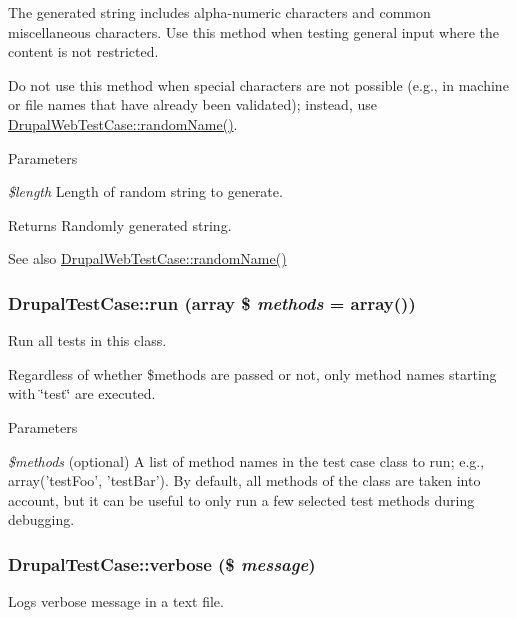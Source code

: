 The generated string includes alpha-\/numeric characters and common miscellaneous characters. Use this method when testing general input where the content is not restricted.

Do not use this method when special characters are not possible (e.g., in machine or file names that have already been validated); instead, use \hyperlink{classDrupalTestCase_ab1137ec76434cdd38ec267977ba153d5}{DrupalWebTestCase::randomName()}.


\begin{DoxyParams}{Parameters}
\item[{\em \$length}]Length of random string to generate.\end{DoxyParams}
\begin{DoxyReturn}{Returns}
Randomly generated string.
\end{DoxyReturn}
\begin{DoxySeeAlso}{See also}
\hyperlink{classDrupalTestCase_ab1137ec76434cdd38ec267977ba153d5}{DrupalWebTestCase::randomName()} 
\end{DoxySeeAlso}
\hypertarget{classDrupalTestCase_a043a6e875fb5f23250b64d6afee79afc}{
\subsubsection[{run}]{\setlength{\rightskip}{0pt plus 5cm}DrupalTestCase::run (array \$ {\em methods} = {\ttfamily array()})}}
\label{classDrupalTestCase_a043a6e875fb5f23250b64d6afee79afc}
Run all tests in this class.

Regardless of whether \$methods are passed or not, only method names starting with \char`\"{}test\char`\"{} are executed.


\begin{DoxyParams}{Parameters}
\item[{\em \$methods}](optional) A list of method names in the test case class to run; e.g., array('testFoo', 'testBar'). By default, all methods of the class are taken into account, but it can be useful to only run a few selected test methods during debugging. \end{DoxyParams}
\hypertarget{classDrupalTestCase_a93e92fcdf32bb955e6c7cdfa21356e76}{
\subsubsection[{verbose}]{\setlength{\rightskip}{0pt plus 5cm}DrupalTestCase::verbose (\$ {\em message})}}
\label{classDrupalTestCase_a93e92fcdf32bb955e6c7cdfa21356e76}
Logs verbose message in a text file.

